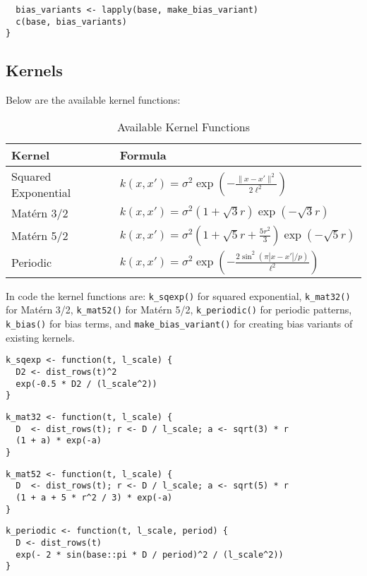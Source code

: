 \documentclass[11pt]{article}
\begin{document}
\begin{lstlisting}
  bias_variants <- lapply(base, make_bias_variant)
  c(base, bias_variants)
}
\end{lstlisting}

\subsection{Kernels}

Below are the available kernel functions:

\begin{table}[h]
\centering
\begin{tabular}{@{}ll@{}}
\toprule
\textbf{Kernel} & \textbf{Formula} \\
\midrule
Squared Exponential & $k(x,x') = \sigma^2 \exp(-\frac{\|x-x'\|^2}{2\ell^2})$ \\
Mat\'ern 3/2 & $k(x,x') = \sigma^2(1+\sqrt{3}r)\exp(-\sqrt{3}r)$ \\
Mat\'ern 5/2 & $k(x,x') = \sigma^2(1+\sqrt{5}r+\frac{5r^2}{3})\exp(-\sqrt{5}r)$ \\
Periodic & $k(x,x') = \sigma^2 \exp(-\frac{2\sin^2(\pi|x-x'|/p)}{\ell^2})$ \\
\bottomrule
\end{tabular}
\caption{Available Kernel Functions}
\end{table}



In code the kernel functions are: \texttt{k\_sqexp()} for squared exponential, \texttt{k\_mat32()} for Mat\'ern 3/2, \texttt{k\_mat52()} for Mat\'ern 5/2, \texttt{k\_periodic()} for periodic patterns, \texttt{k\_bias()} for bias terms, and \texttt{make\_bias\_variant()} for creating bias variants of existing kernels.

\begin{lstlisting}
k_sqexp <- function(t, l_scale) {
  D2 <- dist_rows(t)^2
  exp(-0.5 * D2 / (l_scale^2))
}
\end{lstlisting}

\begin{lstlisting}
k_mat32 <- function(t, l_scale) {
  D  <- dist_rows(t); r <- D / l_scale; a <- sqrt(3) * r
  (1 + a) * exp(-a)
}
\end{lstlisting}

\begin{lstlisting}
k_mat52 <- function(t, l_scale) {
  D  <- dist_rows(t); r <- D / l_scale; a <- sqrt(5) * r
  (1 + a + 5 * r^2 / 3) * exp(-a)
}
\end{lstlisting}

\begin{lstlisting}
k_periodic <- function(t, l_scale, period) {
  D <- dist_rows(t)
  exp(- 2 * sin(base::pi * D / period)^2 / (l_scale^2))
}
\end{lstlisting}
\end{document}
